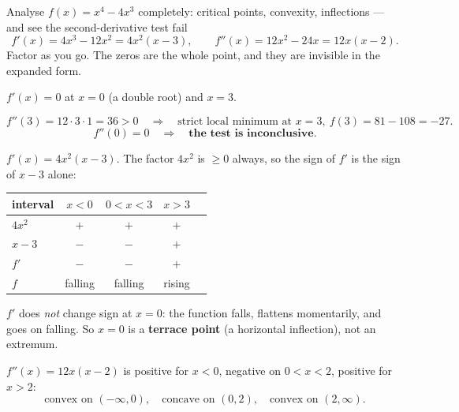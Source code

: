 \begin{worked}{Analyse $f(x)=x^{4}-4x^{3}$ completely: critical points, convexity, inflections --- and see the second-derivative test fail}
\[
  f'(x)=4x^{3}-12x^{2}=4x^{2}(x-3),
  \qquad
  f''(x)=12x^{2}-24x=12x(x-2).
\]
Factor as you go. The zeros are the whole point, and they are invisible in
the expanded form.

$f'(x)=0$ at $x=0$ (a double root) and $x=3$.

\[
  f''(3)=12\cdot3\cdot1=36>0
  \quad\Longrightarrow\quad
  \text{strict local minimum at }x=3,\ f(3)=81-108=-27 .
\]
\[
  f''(0)=0
  \quad\Longrightarrow\quad
  \textbf{the test is inconclusive.}
\]

$f'(x)=4x^{2}(x-3)$. The factor $4x^{2}$ is $\ge0$ always, so the sign of
$f'$ is the sign of $x-3$ alone:
\begin{center}\footnotesize
\begin{tabular}{lcccc}
  \hline
  interval & $x<0$ & $0<x<3$ & $x>3$\\
  \hline
  $4x^{2}$ & $+$ & $+$ & $+$\\
  $x-3$ & $-$ & $-$ & $+$\\
  $f'$ & $-$ & $-$ & $+$\\
  $f$ & falling & falling & rising\\
  \hline
\end{tabular}
\end{center}
$f'$ does \emph{not} change sign at $x=0$: the function falls, flattens
momentarily, and goes on falling. So $x=0$ is a \textbf{terrace point} (a
horizontal inflection), not an extremum.

$f''(x)=12x(x-2)$ is positive for $x<0$, negative on $0<x<2$, positive for
$x>2$:
\[
  \text{convex on }(-\infty,0),\quad
  \text{concave on }(0,2),\quad
  \text{convex on }(2,\infty).
\]


\end{worked}
